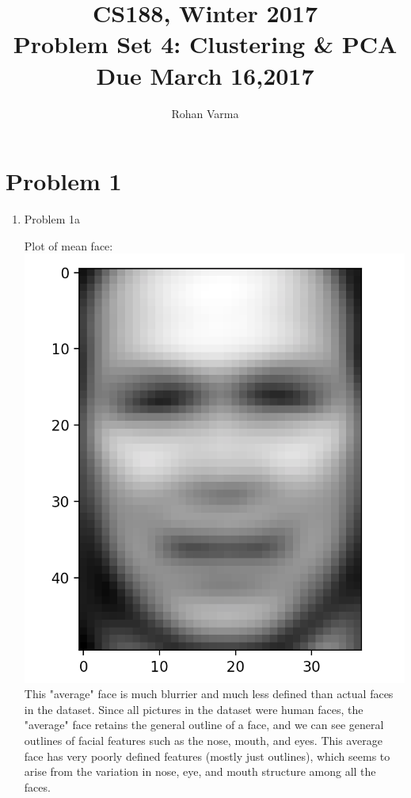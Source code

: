 \documentclass[11pt]{article}
\newcommand{\cnum}{CS188}
\newcommand{\ced}{Winter 2017}
\newcommand{\ctitle}[3]{\title{\vspace{-0.5in}\cnum, \ced\\Problem Set #1: #2\\Due #3}}
\newcommand{\solution}[1]{{{\color{blue}{\bf Solution:} {#1}}}}
\begin{document}
\ctitle{4}{Clustering & PCA}{March 16,2017}
\author{Rohan Varma}
\date{}
\maketitle
\vspace{-0.75in}

\section{Problem 1}
\begin{enumerate}
\item Problem 1a

\solution{
Plot of mean face: \newline{}
\includegraphics[scale=0.75]{mean_face.png}
\newline{}
This "average" face is much blurrier and much less defined than actual faces in the dataset. Since all pictures in the dataset were human faces, the "average" face retains the general outline of a face, and we can see general outlines of facial features such as the nose, mouth, and eyes. This average face has very poorly defined features (mostly just outlines), which seems to arise from the variation in nose, eye, and mouth structure among all the faces. 
}


\end{enumerate}
\end{document}
